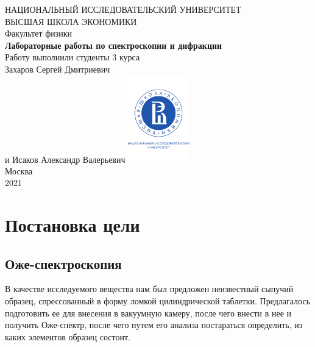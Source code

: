 \documentclass[a4paper, 12pt]{article}
\begin{document}
	\begin{titlepage}
		\begin{center}
			$$$$
			$$$$
			$$$$
			$$$$
			{\Large{НАЦИОНАЛЬНЫЙ ИССЛЕДОВАТЕЛЬСКИЙ УНИВЕРСИТЕТ}}\\
			\vspace{0.1cm}
			{\Large{ВЫСШАЯ ШКОЛА ЭКОНОМИКИ}}\\
			\vspace{0.25cm}
			{\large{Факультет физики}}\\
			\vspace{5.5cm}
			{\Huge\textbf{{Лабораторные работы по спектроскопии и дифракции}}}\\%
			\vspace{1cm}
			{Работу выполнили студенты 3 курса}\\
			{Захаров Сергей Дмитриевич}\\
			{и Исаков Александр Валерьевич}
			\vfill
			\includegraphics[width = 0.2\textwidth]{HSElogo}\\
			\vfill
			Москва\\
			2021
		\end{center}
	\end{titlepage}
	
	\tableofcontents
	
	\newpage
	
	\section{Постановка цели}
	
	\subsection{Оже-спектроскопия}
	
	В качестве исследуемого вещества нам был предложен неизвестный сыпучий образец, спрессованный в форму ломкой цилиндрической таблетки. Предлагалось подготовить ее для внесения в вакуумную камеру, после чего внести в нее и получить Оже-спектр, после чего путем его анализа постараться определить, из каких элементов образец состоит.
	
\end{document}
